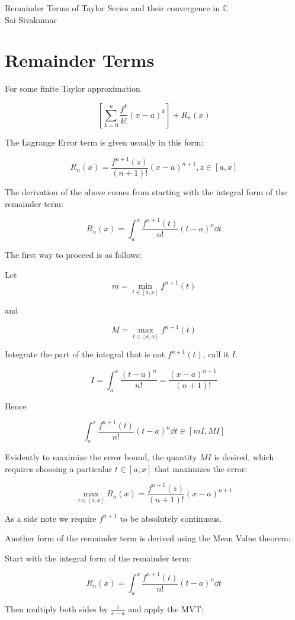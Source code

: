 \documentclass[11pt]{article}
\begin{document}
\setcounter{page}{1}

\begin{center}
Remainder Terms of Taylor Series and their convergence in $\mathbb{C}$\\
Sai Sivakumar
\end{center}

\section{Remainder Terms}

For some finite Taylor approximation

$$\left[\sum_{k=0}^n\frac{f^{k}}{k!}(x-a)^k \right]+ R_n(x)$$

The Lagrange Error term is given usually in this form:

$$R_n(x) = \frac{f^{n+1}(z)}{(n+1)!}(x-a)^{n+1}, z\in[a,x]$$

The derivation of the above comes from starting with the integral form of the remainder term:

$$R_n(x) = \int_a^x \frac{f^{n+1}(t)}{n!}(t-a)^{n}\dd{t}$$

The first way to proceed is as follows:

Let 
$$m = \min_{t\in[a,x]} f^{n+1}(t)$$

and

$$M = \max_{t\in[a,x]} f^{n+1}(t)$$

Integrate the part of the integral that is not $f^{n+1}(t)$, call it $I$.

$$I = \int_a^x \frac{(t-a)^n}{n!} = \frac{(x-a)^{n+1}}{(n+1)!}$$

Hence

$$\int_a^x \frac{f^{n+1}(t)}{n!}(t-a)^{n}\dd{t} \in [mI,MI]$$

Evidently to maximize the error bound, the quantity $MI$ is desired, which requires choosing a particular $t\in[a,x]$ that maximizes the error:

$$\max_{z\in[a,x]} R_n(x) = \frac{f^{n+1}(z)}{(n+1)!}(x-a)^{n+1}$$

As a side note we require $f^{n+1}$ to be absolutely continuous.

Another form of the remainder term is derived using the Mean Value theorem:

Start with the integral form of the remainder term:

$$R_n(x) = \int_a^x \frac{f^{n+1}(t)}{n!}(t-a)^{n}\dd{t}$$

Then multiply both sides by $\frac{1}{x-a}$ and apply the MVT:
\end{document}

